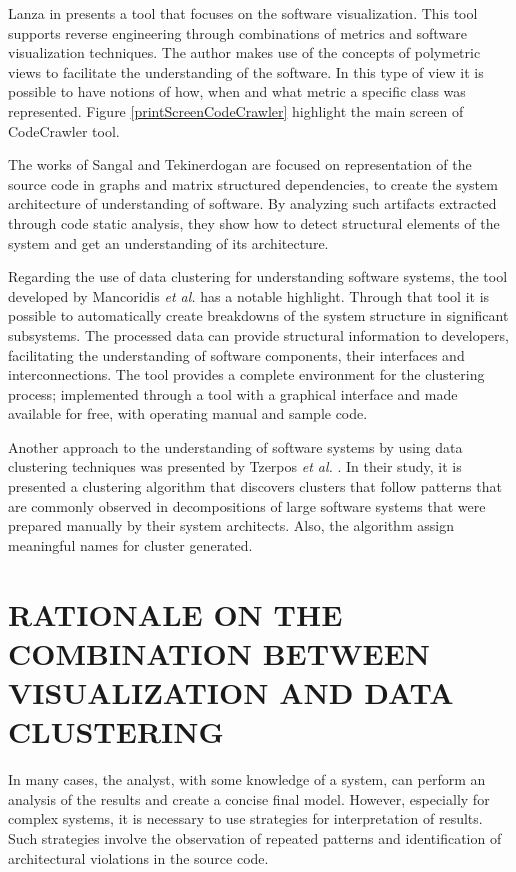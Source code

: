 \documentclass{sig-alternate-05-2015}
\begin{document}
Lanza in \cite {lanza_codecrawler-lessons_2003} presents a tool that focuses on the software visualization. This tool supports reverse engineering through combinations of metrics and software visualization techniques. The author makes use of the concepts of polymetric views to facilitate the understanding of the software. In this type of view it is possible to have notions of how, when and what metric a specific class was represented. Figure \ref{printScreenCodeCrawler} highlight the main screen of CodeCrawler tool.

The works of Sangal \cite{Sangal_2005} and Tekinerdogan \cite{Tekinerdogan_2009}  are focused on representation of the source code in graphs and matrix structured dependencies, to create the system architecture of understanding of software. By analyzing such artifacts extracted through code static analysis, they show how to detect structural elements of the system and get an understanding of its architecture.

Regarding the use of data clustering for understanding software systems, the tool developed by Mancoridis \textit {et al.} \cite {Mancoridis_1999}  has a notable highlight. Through that tool it is possible to automatically create breakdowns of the system structure in significant subsystems. The processed data can provide structural information to developers, facilitating the understanding of software components, their interfaces and interconnections. The tool provides a complete environment for the clustering process; implemented through a tool with a graphical interface and made available for free, with operating manual and sample code.

Another approach to the understanding of software systems by using data clustering techniques was presented by Tzerpos \textit{et al.} \cite {Tzerpos_vassilios}. In their study, it is presented a clustering algorithm that discovers clusters that follow patterns that are commonly observed in decompositions of large software systems that were prepared manually by their system architects.  Also, the algorithm assign meaningful names for cluster generated. 


\section{RATIONALE ON THE COMBINATION BETWEEN VISUALIZATION AND DATA CLUSTERING}\label{sec:rationale}%

In many cases, the analyst, with some knowledge of a system, can perform an analysis of the results and create a concise final model. However, especially for complex systems, it is necessary to use strategies for interpretation of results. Such strategies involve the observation of repeated patterns and identification of architectural violations in the source code.
\end{document}
